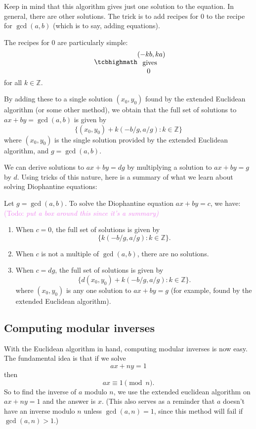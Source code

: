 \documentclass{article}
\theoremstyle{plain}
\theoremstyle{definition}
\theoremstyle{remark}
\numberwithin{theorem}{section}
\newcommand{\KS}[1]{\textcolor{violet}{{\sf (Todo:} {\sl{#1})}}}
\newcommand{\KS}[1]{}
\newcommand{\ZZ}{\mathbb{Z}}
\begin{document}
Keep in mind that this algorithm gives just one solution to the equation.  In general, there are other solutions.  The trick is to add recipes for $0$ to the recipe for $\gcd(a,b)$ (which is to say, adding equations).

The recipes for $0$ are particularly simple:
\[
  \card{ $(-kb,ka)$\\ gives \\ $0$ }
  \]
for all $k \in \ZZ$.

By adding these to a single solution $(x_0,y_0)$ found by the extended Euclidean algorithm (or some other method), we obtain that the full set of solutions to $ax + by = \gcd(a,b)$ is given by
\[
	\{ (x_0, y_0) + k(-b/g,a/g) : k \in \ZZ \}
\]
where $(x_0, y_0)$ is the single solution provided by the extended Euclidean algorithm, and $g = \gcd(a,b)$.

We can derive solutions to $ax+by = dg$ by multiplying a solution to $ax+by=g$ by $d$.  Using tricks of this nature, here is a summary of what we learn about solving Diophantine equations:

Let $g = \gcd(a,b)$.  To solve the Diophantine equation $ax + by = c$, we have:\KS{put a box around this since it's a summary}

\begin{enumerate}
\item When $c = 0$, the full set of solutions is given by
\[
\{ k(-b/g,a/g) : k \in \ZZ \}.
\]
\item When $c$ is not a multiple of $\gcd(a,b)$, there are no solutions.
\item When $c = d g$, the full set of solutions is given by
\[
\{ d(x_0, y_0) + k(-b/g, a/g) : k \in \ZZ \}.
\]
where $(x_0, y_0)$ is any one solution to $ax+by=g$ (for example, found by the extended Euclidean algorithm).
\end{enumerate}




\subsection{Computing modular inverses}

With the Euclidean algorithm in hand, computing modular inverses is now easy.  The fundamental idea is that if we solve
\[
ax + ny = 1
\]
then
\[
ax \equiv 1 \pmod n.
\]
So to find the inverse of $a$ modulo $n$, we use the extended euclidean algorithm on $ax+ny=1$ and the answer is $x$.  (This also serves as a reminder that $a$ doesn't have an inverse modulo $n$ unless $\gcd(a,n)=1$, since this method will fail if $\gcd(a,n) > 1$.)
\end{document}

